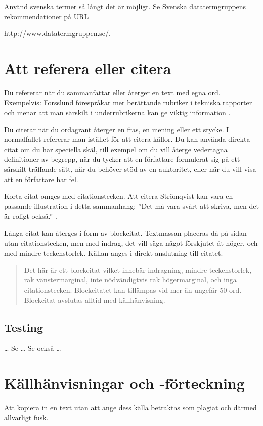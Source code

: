 Använd svenska termer så långt det är möjligt.
Se Svenska datatermgruppens \citep{Datatermgruppen} rekommendationer på URL
\begin{center}
	\url{http://www.datatermgruppen.se/}.
\end{center}


\section{Att referera eller citera}
\label{sec:ref}
\noindent
Du refererar när du sammanfattar eller återger en text med egna ord.
Exempelvis:
Forsslund förespråkar mer berättande rubriker i tekniska rapporter och menar 
att man särskilt i underrubrikerna kan ge viktig information 
\citep{Forsslund1969raf}.

Du citerar när du ordagrant återger en fras, en mening eller ett stycke.
I normalfallet refererar man istället för att citera källor.
Du kan använda direkta citat om du har speciella skäl, till exempel om du vill 
återge vedertagna definitioner av begrepp, när du tycker att en författare 
formulerat sig på ett särskilt träffande sätt, när du behöver stöd av en 
auktoritet, eller när du vill visa att en författare har fel.

Korta citat omges med citationstecken.
Att citera Strömqvist kan vara en passande illustration i detta sammanhang:
''Det må vara svårt att skriva, men det är roligt också.'' \citep[sidan 
X]{Stromquist2000s}.

Långa citat kan återges i form av blockcitat.
Textmassan placeras då på sidan utan citationstecken, men med indrag, det vill 
säga något förskjutet åt höger, och med mindre teckenstorlek.
Källan anges i direkt anslutning till citatet.
\begin{quote}
	Det här är ett blockcitat vilket innebär indragning, mindre teckenstorlek, 
	rak vänstermarginal, inte nödvändigtvis rak högermarginal, och inga 
	citationstecken.
	Blockcitatet kan tillämpas vid mer än ungefär 50 ord.  Blockcitat avslutas 
	alltid med källhänvisning. \citep[sidan X]{Stromquist2000s}
\end{quote}

\subsection{Testing}
\noindent
\dots
Se  \dots
Se också  \dots


\section{Källhänvisningar och -förteckning}
\label{sec:references}
\noindent
Att kopiera in en text utan att ange dess källa betraktas som plagiat och 
därmed allvarligt fusk.

